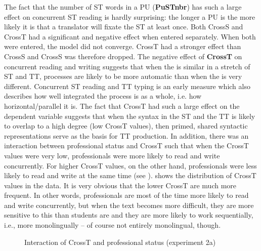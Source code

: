 \documentclass[output=paper]{LSP/langsci}
\begin{document}
The fact that the number of ST words in a PU (\textbf{PuSTnbr}) has such a large effect on concurrent ST reading is hardly surprising: the longer a PU is the more likely it is that a translator will fixate the ST at least once. Both CrossS and CrossT had a significant and negative effect when entered separately. When both were entered, the model did not converge. CrossT had a stronger effect than CrossS and CrossS was therefore dropped. The negative effect of \textbf{CrossT} on concurrent reading and writing suggests that when the  is similar in a stretch of ST and TT, processes are likely to be more automatic than when the  is very different. Concurrent ST reading and TT typing is an early measure which also describes how well integrated the process is as a whole, i.e. how horizontal/parallel it is. The fact that CrossT had such a large effect on the dependent variable suggests that when the syntax in the ST and the TT is likely to overlap to a high degree (low CrossT values), then primed, shared syntactic representations serve as the basis for TT production. In addition, there was an interaction between professional status and CrossT such that when the CrossT values were very low, professionals were more likely to read and write concurrently. For higher CrossT values, on the other hand, professionals were less likely to read and write at the same time (see ).  shows the distribution of CrossT values in the data. It is very obvious that the lower CrossT are much more frequent. In other words, professionals are most of the time more likely to read and write concurrently, but when the text becomes more difficult, they are more sensitive to this than students are and they are more likely to work sequentially, i.e., more monolingually -- of course not entirely monolingual, though.

 
  
\begin{figure}
\caption{Interaction of CrossT and professional status (experiment 2a)}
\label{schaeffer-carl:fig:6}
\end{figure}
\end{document}
